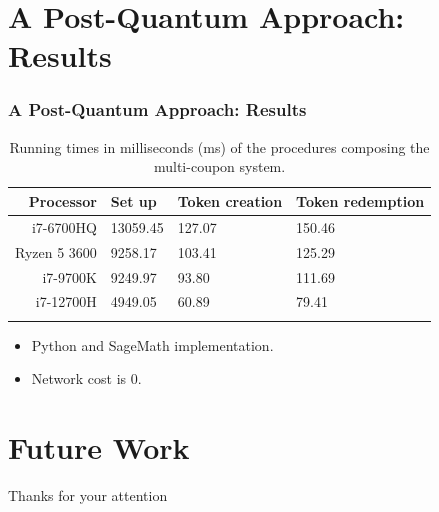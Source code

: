 \documentclass[presentation]{beamer}
\begin{document}
\section{A Post-Quantum Approach: Results}
\begin{frame}
  \frametitle{A Post-Quantum Approach: Results}
  \begin{table}[!h]
    \caption{Running times in milliseconds (ms) of the procedures composing the multi-coupon system.}\label{tab:results}
    \centering
    \begin{tabular}[c]{r|lll}
      \toprule
      Processor & Set up & Token creation & Token redemption \\
      \midrule
      i7-6700HQ    & 13059.45 & 127.07 & 150.46 \\
      Ryzen 5 3600 & 9258.17 & 103.41 & 125.29 \\
      i7-9700K     & 9249.97 & 93.80 & 111.69 \\
      i7-12700H    & 4949.05 & 60.89 & 79.41 \\
      \botrule
    \end{tabular}
  \end{table}
  \begin{itemize}
    \item Python and SageMath implementation.
    \item Network cost is 0.
  \end{itemize}
\end{frame}


\section{Future Work}




\begin{frame}
  \huge{Thanks for your attention}
\end{frame}

%   
%   
\end{document}
